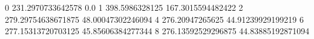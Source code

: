 0 231.2970733642578 0.0
1 398.5986328125 167.3015594482422
2 279.29754638671875 48.00047302246094
4 276.20947265625 44.91239929199219
6 277.15313720703125 45.85606384277344
8 276.13592529296875 44.83885192871094
